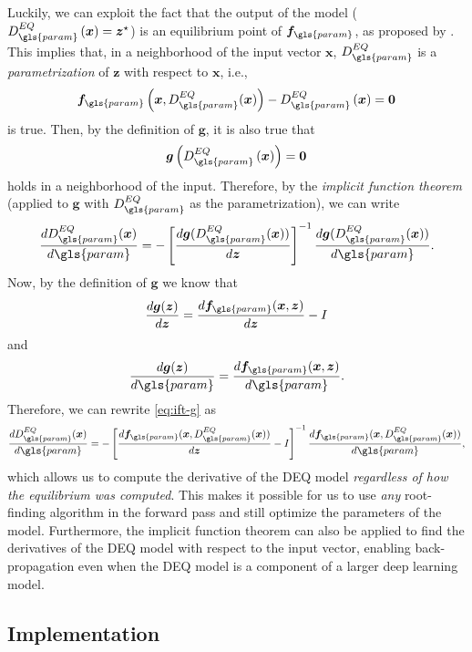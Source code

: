 Luckily, we can exploit the fact that the output of the model ($D^{EQ}_{\gls{param}}\left( \bm{x} \right) = \bm{z}^{\star}$) is an equilibrium point of $\bm{f}_{\gls{param}}$, as proposed by \textcite{Bai2019}.
This implies that, in a neighborhood of the input vector $\bm{x}$, $D^{EQ}_{\gls{param}}$ is a \emph{parametrization} of $\bm{z}$ with respect to $\bm{x}$, i.e., \[
    \bm{f}_{\gls{param}}\left( \bm{x},D^{EQ}_{\gls{param}}(\bm{x}) \right) -D^{EQ}_{\gls{param}}\left( \bm{x} \right) = \bm{0}
\] is true. Then, by the definition of $\bm{g}$, it is also true that \[
\bm{g}\left( D^{EQ}_{\gls{param}}\left( \bm{x} \right) \right) = \bm{0}
\] holds in a neighborhood of the input.
Therefore, by the \emph{implicit function theorem} (applied to $\bm{g}$ with $D^{EQ}_{\gls{param}}$ as the parametrization), we can write
\begin{equation}\label{eq:ift-g}
    \frac{d D^{EQ}_{\gls{param}}(\bm{x})}{d \gls{param}} = - \left[ \frac{d \bm{g}(D^{EQ}_{\gls{param}}(\bm{x}))}{d \bm{z}} \right]^{-1} \frac{d \bm{g}(D^{EQ}_{\gls{param}}(\bm{x}))}{d \gls{param}}
.\end{equation}
Now, by the definition of $\bm{g}$ we know that \[
    \frac{d \bm{g}(\bm{z})}{d \bm{z}} = \frac{d \bm{f}_{\gls{param}}(\bm{x},\bm{z})}{d \bm{z}} - I 
\] and \[
\frac{d \bm{g}(\bm{z})}{d \gls{param}} = \frac{d \bm{f}_{\gls{param}}(\bm{x},\bm{z})}{d \gls{param}}
.\] Therefore, we can rewrite \eqref{eq:ift-g} as
\begin{equation}\label{eq:deq-jacobian}
    \frac{d D^{EQ}_{\gls{param}}(\bm{x})}{d \gls{param}} = - \left[ \frac{d \bm{f}_{\gls{param}}(\bm{x},D^{EQ}_{\gls{param}}(\bm{x}))}{d \bm{z}} - I \right]^{-1} \frac{d \bm{f}_{\gls{param}}(\bm{x},D^{EQ}_{\gls{param}}(\bm{x}))}{d \gls{param}}
,\end{equation}
which allows us to compute the derivative of the \gls{DEQ} model \emph{regardless of how the equilibrium was computed}.
This makes it possible for us to use \emph{any} root-finding algorithm in the forward pass and still optimize the parameters of the model.
Furthermore, the implicit function theorem can also be applied to find the derivatives of the DEQ model with respect to the input vector, enabling back-propagation even when the \gls{DEQ} model is a component of a larger deep learning model.

\subsection{Implementation}\label{sec:deq-backward-implementation}


